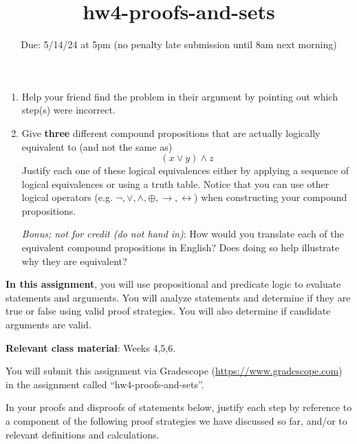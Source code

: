 \begin{enumerate}[labelindent=0pt, leftmargin=0pt]
\begin{enumerate}
        \item\gradeComplete 
        Help your friend find the problem in their argument by pointing out which step(s) were incorrect.
        
        \item\gradeComplete Give {\bf three} different compound propositions
        that are actually logically equivalent to (and not the same as)
        \[
            (x \lor y) \land z
        \]
        Justify each one of these logical equivalences either by applying a sequence of logical equivalences
        or using a truth table.  Notice that you can use other logical operators (e.g. $\lnot, \lor, \land, \oplus, \to, 
        \leftrightarrow$) 
        when constructing your compound propositions.
     
        {\it Bonus; not for credit (do not hand in)}: How would you translate each of the equivalent compound
        propositions in English? Does doing so help illustrate why they are equivalent?
        \end{enumerate}
        
     
\end{enumerate}

\newpage


\title{hw4-proofs-and-sets}
\date{Due: 5/14/24 at 5pm (no penalty late submission until 8am next morning)}

\maketitle
\thispagestyle{fancy}


{\bf In this assignment}, you will use propositional and predicate logic to evaluate
statements and arguments. You will analyze statements and determine if they are true or false using valid proof strategies.
You will also determine if candidate arguments are valid.


{\bf Relevant class material}: Weeks 4,5,6.

You will submit this assignment via Gradescope
(\href{https://www.gradescope.com}{https://www.gradescope.com}) 
in the assignment called ``hw4-proofs-and-sets''.

\instructions


\vspace{-10pt}

In your proofs and disproofs of statements below, justify each  step
by reference to  a component of the  following proof  strategies
we  have discussed so far, and/or to relevant definitions and calculations.

